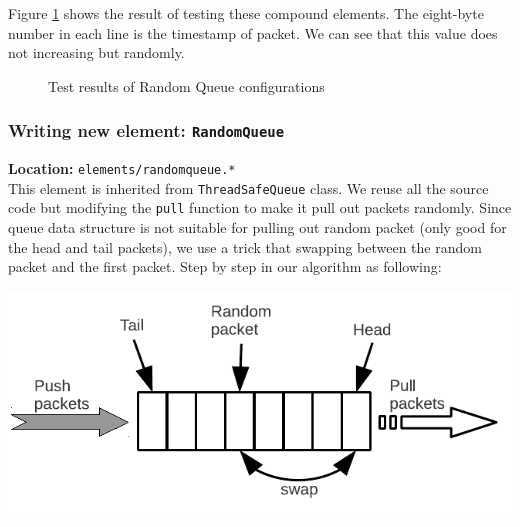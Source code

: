 \documentclass[a4paper]{article}
\begin{document}
  Figure \ref{fig:test-clickrandomqueue} shows the result of testing these compound elements. The eight-byte number in each line is the timestamp of packet. We can see that this value does not increasing but randomly. 
    \begin{figure}
      \centering
      \caption{Test results of Random Queue configurations}
      \label{fig:test-clickrandomqueue}
  \end{figure}
  
  \subsubsection{Writing new element: \texttt{RandomQueue}}
  \textbf{Location:} \texttt{elements/randomqueue.*} \\
  This element is inherited from \texttt{ThreadSafeQueue} class. We reuse all the source code but modifying the \texttt{pull} function to make it pull out packets randomly. Since queue data structure is not suitable for pulling out random packet (only good for the head and tail packets), we use a trick that swapping between the random packet and the first packet. Step by step in our algorithm as following:
  \begin{center}
	\includegraphics[scale=0.80]{randomqueue-alg.pdf}
	\label{fig:randomqueue}
  \end{center}
\end{document}
